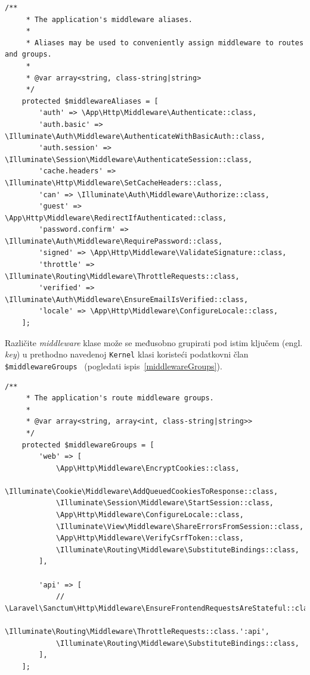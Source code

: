\begin{lstlisting}[caption={Definiranje \textit{middleware} \textit{aliasa}}, label=middlewareAliases]
    /**
     * The application's middleware aliases.
     *
     * Aliases may be used to conveniently assign middleware to routes and groups.
     *
     * @var array<string, class-string|string>
     */
    protected $middlewareAliases = [
        'auth' => \App\Http\Middleware\Authenticate::class,
        'auth.basic' => \Illuminate\Auth\Middleware\AuthenticateWithBasicAuth::class,
        'auth.session' => \Illuminate\Session\Middleware\AuthenticateSession::class,
        'cache.headers' => \Illuminate\Http\Middleware\SetCacheHeaders::class,
        'can' => \Illuminate\Auth\Middleware\Authorize::class,
        'guest' => \App\Http\Middleware\RedirectIfAuthenticated::class,
        'password.confirm' => \Illuminate\Auth\Middleware\RequirePassword::class,
        'signed' => \App\Http\Middleware\ValidateSignature::class,
        'throttle' => \Illuminate\Routing\Middleware\ThrottleRequests::class,
        'verified' => \Illuminate\Auth\Middleware\EnsureEmailIsVerified::class,
        'locale' => \App\Http\Middleware\ConfigureLocale::class,
    ];
\end{lstlisting}

Različite \textit{middleware} klase može se međusobno grupirati pod istim ključem (engl. \textit{key}) u prethodno navedenoj \texttt{Kernel} klasi  koristeći podatkovni član \texttt{\$middlewareGroups}~\cite{middleware} (pogledati ispis~\ref{middlewareGroups}).


\begin{lstlisting}[caption={Definiranje \textit{middleware} grupa}, label=middlewareGroups]
    /**
     * The application's route middleware groups.
     *
     * @var array<string, array<int, class-string|string>>
     */
    protected $middlewareGroups = [
        'web' => [
            \App\Http\Middleware\EncryptCookies::class,
            \Illuminate\Cookie\Middleware\AddQueuedCookiesToResponse::class,
            \Illuminate\Session\Middleware\StartSession::class,
            \App\Http\Middleware\ConfigureLocale::class,
            \Illuminate\View\Middleware\ShareErrorsFromSession::class,
            \App\Http\Middleware\VerifyCsrfToken::class,
            \Illuminate\Routing\Middleware\SubstituteBindings::class,
        ],

        'api' => [
            // \Laravel\Sanctum\Http\Middleware\EnsureFrontendRequestsAreStateful::class,
            \Illuminate\Routing\Middleware\ThrottleRequests::class.':api',
            \Illuminate\Routing\Middleware\SubstituteBindings::class,
        ],
    ];
\end{lstlisting}

